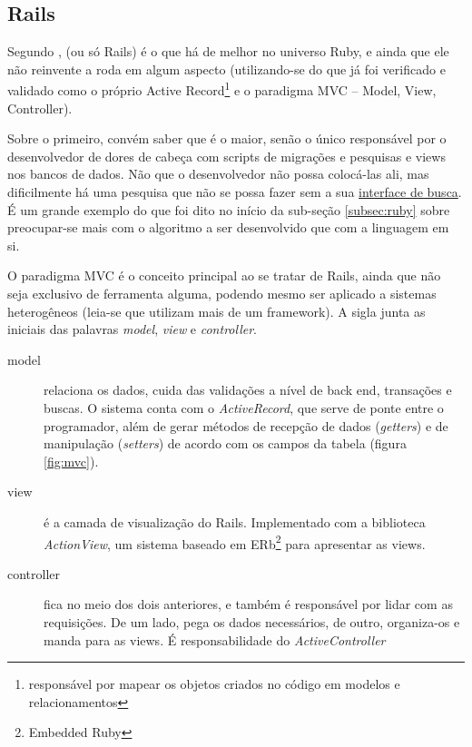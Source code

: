 \subsection{Rails}
\label{subsec:rails}

Segundo \citet[p.~613]{Rcook:09},  (ou só Rails) é o que há de melhor
no universo Ruby, e ainda que ele não reinvente a roda em algum aspecto (utilizando-se
do que já foi verificado e validado como o próprio Active Record\footnote{responsável
por mapear os objetos criados no código em modelos e relacionamentos} e o paradigma MVC
-- Model, View, Controller).

Sobre o primeiro, convém saber que é o maior, senão o único responsável por 
o desenvolvedor de dores de cabeça com scripts de migrações e pesquisas e views nos
bancos de dados. Não que o desenvolvedor não possa colocá-las ali, mas dificilmente
há uma pesquisa que não se possa fazer sem a sua
\href{https://guides.rubyonrails.org/active_record_querying.html}{interface de busca}.
É um grande exemplo do que foi dito no início da sub-seção \ref{subsec:ruby} sobre
preocupar-se mais com o algoritmo a ser desenvolvido que com a linguagem em si.

O paradigma MVC é o conceito principal ao se tratar de Rails, ainda que não seja exclusivo
de ferramenta alguma, podendo mesmo ser aplicado a sistemas heterogêneos (leia-se que
utilizam mais de um framework). A sigla junta as iniciais das palavras \emph{model},
\emph{view} e \emph{controller}.
\begin{description}
    \item[model] relaciona os dados, cuida das validações a nível de back end, transações
    e buscas. O sistema conta com o \emph{ActiveRecord}, que serve de ponte entre o
    programador, além de gerar métodos de recepção de dados (\emph{getters}) e de manipulação
    (\emph{setters}) de acordo com os campos da tabela (figura \ref{fig:mvc}).
    \item[view] é a camada de visualização do Rails. Implementado com a biblioteca
    \emph{ActionView}, um sistema baseado em ERb\footnote{Embedded Ruby} para apresentar as
    views.
    \item[controller] fica no meio dos dois anteriores, e também é responsável por lidar com
    as requisições. De um lado, pega os dados necessários, de outro, organiza-os e manda para as
    views. É responsabilidade do \emph{ActiveController}
\end{description}


